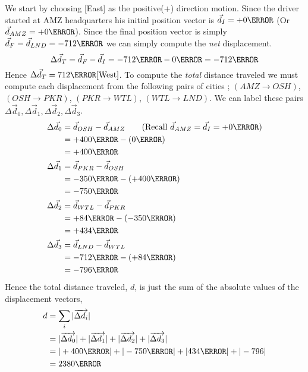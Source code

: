 \documentclass[12pt]{article} %
\newcommand{\tx}[1]{\text{#1}}
\begin{document}
\begin{qstn}[4]
\begin{soln}
    We start by choosing [East] as the positive(+) direction motion. Since the driver started at AMZ headquarters his initial position vector is $\vec d_I = +0\km$ (Or $\vec d_{AMZ} = +0\km$). Since the final position vector is simply $\vec d_F = \vec d_{LND} = -712\km$ we can simply compute the \emph{net} displacement.
    $$\Delta \vec d_T = \vec d_F - \vec d_I = -712\km - 0\km = -712 \km $$
    Hence $\Delta \vec d_T = 712\km [\tx{West}]$. To compute the \emph{total} distance traveled we must compute each 
    displacement from the following pairs of cities ; $(AMZ \rightarrow OSH)$, $(OSH \rightarrow PKR)$, $(PKR \rightarrow WTL)$, $(WTL \rightarrow LND)$. We can label these pairs $\Delta \vec d_0, \Delta \vec d_1, \Delta \vec d_2, \Delta \vec d_3$.
    \begin{align*}
        \Delta \vec d_0 &= \vec d_{OSH} - \vec d_{AMZ} \tag{\tx{Recall} $\vec d_{AMZ} = \vec d_I = +0\km$}\\
        &= +400\km - (0\km)\\
        &= +400\km\\
        \Delta \vec d_1 &= \vec d_{PKR} - \vec d_{OSH}\\
        &= -350\km - (+400\km)\\
        &= -750\km\\
        \Delta \vec d_2 &= \vec d_{WTL} - \vec d_{PKR}\\
        &= +84\km - (-350\km)\\
        &= +434\km\\
        \Delta \vec d_3 &= \vec d_{LND} - \vec d_{WTL}\\
        &= -712\km - (+84\km)\\
        &= -796 \km
    \end{align*}
    Hence the total distance traveled, $d$, is just the sum of the absolute values of the displacement vectors,
    \begin{align*}
    d &= \sum_i |\overrightarrow{\Delta d_i}|\\
     &= |\overrightarrow{\Delta d_0}| + |\overrightarrow{\Delta d_1}| + |\overrightarrow{\Delta d_2}| + |\overrightarrow{\Delta d_3}|\\
     &= |+400 \km| + |-750 \km| + |434 \km| + |-796|\\
     &= 2380 \km
    \end{align*}
\end{soln}




\end{qstn}
\end{document}
